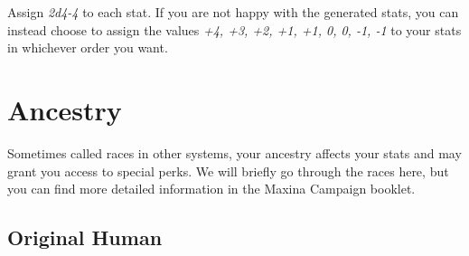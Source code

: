 Assign \emph{2d4-4} to each stat. If you are not happy with the generated
stats, you can instead choose to assign the values  \emph{+4, +3, +2, +1, +1,
0, 0, -1, -1} to your stats in whichever order you want.


\section{Ancestry}
Sometimes called races in other systems, your ancestry affects your stats and
may grant you access to special perks. We will briefly go through the races
here, but you can find more detailed information in the Maxina Campaign
booklet.

\subsection{Original Human}

